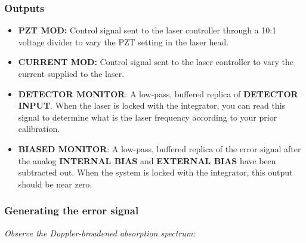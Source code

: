 \documentclass{../lab}
\begin{document}
\subsubsection{Outputs}

\begin{itemize}
    \item \textbf{PZT MOD:} Control signal sent to the laser controller through a 10:1 voltage divider to vary the PZT setting in the laser head.

    \item \textbf{CURRENT MOD:} Control signal sent to the laser controller to vary the current supplied to the laser.

    \item \textbf{DETECTOR MONITOR}: A low-pass, buffered replica of \textbf{DETECTOR INPUT}. When the laser is locked with the integrator, you can read this signal to determine what is the laser frequency according to your prior calibration.

    \item \textbf{BIASED MONITOR}: A low-pass, buffered replica of the error signal after the analog \textbf{INTERNAL BIAS} and \textbf{EXTERNAL BIAS} have been subtracted out. When the system is locked with the integrator, this output should be near zero.
\end{itemize}

\subsubsection{Generating the error signal}

\emph{Observe the Doppler-broadened absorption spectrum:}
\end{document}
